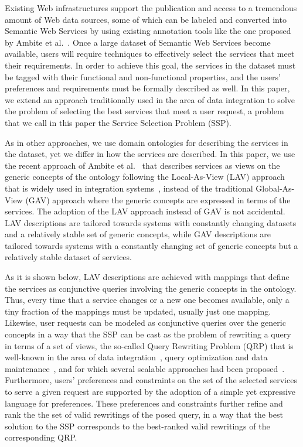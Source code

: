\documentclass{llncs}
\begin{document}
Existing Web infrastructures support the publication and access to a
tremendous amount of Web data sources, some of which can be labeled
and converted into Semantic Web Services by using existing annotation
tools like the one proposed by Ambite et al.\ \cite{AmbiteISWC09}.
Once a large dataset of Semantic Web Services become available, users
will require techniques to effectively select the services that meet
their requirements.
In order to achieve this goal, the services in the dataset must be
tagged with their functional and non-functional properties, and
the users' preferences and requirements must be formally described
as well.
In this paper, we extend an approach traditionally used in the area of
data integration to solve the problem of selecting the best services
that meet a user request, a problem that we call in this paper the
Service Selection Problem (SSP).

As in other approaches, we use domain ontologies for describing
the services in the dataset, yet we differ in how the services are described.
In this paper, we use the recent approach of Ambite et al.\ \cite{AmbiteISWC09}
that describes services as views on the generic concepts of the ontology
following the Local-As-View (LAV) approach that is widely used in integration
systems~\cite{levy:bucket}, instead of the traditional Global-As-View (GAV)
approach where the generic concepts are expressed in terms of the services.
The adoption of the LAV approach instead of GAV is not accidental.
LAV descriptions are tailored towards systems with constantly changing
datasets and a relatively stable set of generic concepts, while GAV
descriptions are tailored towards systems with a constantly changing
set of generic concepts but a relatively stable dataset of services.

As it is shown below, LAV descriptions are achieved with mappings
that define the services as conjunctive queries involving the generic
concepts in the ontology. Thus, every time that a service changes or
a new one becomes available, only a tiny fraction of the mappings
must be updated, usually just one mapping.
Likewise, user requests can be modeled as conjunctive queries over the
generic concepts in a way that the SSP can be cast as the problem
of rewriting a query in terms of a set of views, the so-called Query
Rewriting Problem (QRP) that is well-known in the area of data
integration~\cite{Chen05,JaudoinPRST05}, query optimization and data
maintenance~\cite{AfratiLU07,levy:bucket}, and for which several
scalable approaches had been
proposed~\cite{arvelo:aaai06,pods:DuschkaG97,sac:DuschkaG97,levy:bucket,pottinger:minicon}.
Furthermore, users' preferences and constraints on the set of the
selected services to serve a given request are supported by the
adoption of a simple yet expressive language for preferences. 
These preferences and constraints further refine and rank the
the set of valid rewritings of the posed query, in a way that
the best solution to the SSP corresponds to the best-ranked 
valid rewritings of the corresponding QRP.
\end{document}

